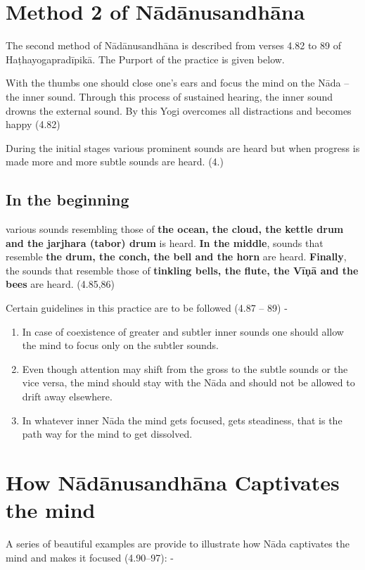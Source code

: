\section*{Method 2 of Nādānusandhāna}

The second method of Nādānusandhāna is described from verses 4.82 to 89 of Haṭhayogapradīpikā. The Purport of the practice is given below.

With the thumbs one should close one’s ears and focus the mind on the Nāda – the inner sound. Through this process of sustained hearing, the inner sound drowns the external sound. By this Yogi overcomes all distractions and becomes happy (4.82)

During the initial stages various prominent sounds are heard but when progress is made more and more subtle sounds are heard. (4.) 

\subsection*{In the beginning}

 various sounds resembling those of \textbf{the ocean, the cloud, the kettle drum and the jarjhara (tabor) drum} is heard. \textbf{In the middle}, sounds that resemble \textbf{the drum, the conch, the bell and the horn} are heard. \textbf{Finally}, the sounds that resemble those of \textbf{tinkling bells, the flute, the Vīṇā and the bees} are heard. (4.85,86) 

Certain guidelines in this practice are to be followed (4.87 -- 89) -

\begin{enumerate}
\itemsep=0pt
\item In case of coexistence of greater and subtler inner sounds one should allow the mind to focus only on the subtler sounds. 
\item Even though attention may shift from the gross to the subtle sounds or the vice versa, the mind should stay with the Nāda and should not be allowed to drift away elsewhere.
\item In whatever inner Nāda the mind gets focused, gets steadiness, that is the path way for the mind to get dissolved. 
\end{enumerate}

\section*{How Nādānusandhāna Captivates the mind}

A series of beautiful examples are provide to illustrate how Nāda captivates the mind and makes it focused (4.90--97): -

